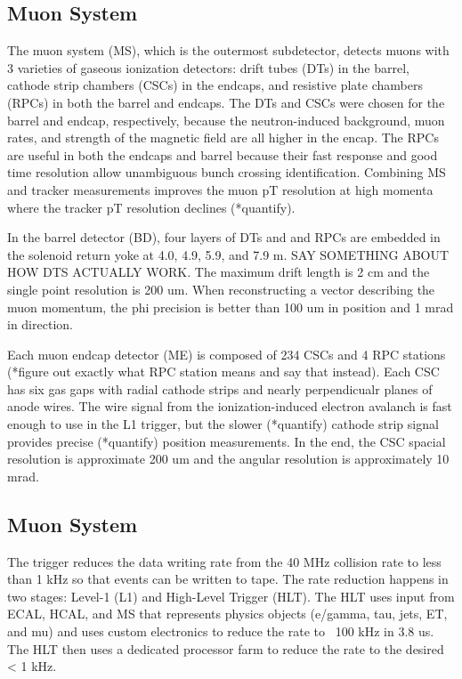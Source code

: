 \documentclass[12pt]{article}
\begin{document}
\subsection{Muon System}
        The muon system (MS), which is the outermost subdetector, detects muons with 3 varieties of gaseous ionization detectors: drift tubes (DTs) in the barrel, cathode strip chambers (CSCs) in the endcaps, and resistive plate chambers (RPCs) in both the barrel and endcaps. The DTs and CSCs were chosen for the barrel and endcap, respectively, because the neutron-induced background, muon rates, and strength of the magnetic field are all higher in the encap. The RPCs are useful in both the endcaps and barrel because their fast response and good time resolution allow unambiguous bunch crossing identification. Combining MS and tracker measurements improves the muon pT resolution at high momenta where the tracker pT resolution declines (*quantify).

        In the barrel detector (BD), four layers of DTs and and RPCs are embedded in the solenoid return yoke at 4.0, 4.9, 5.9, and 7.9 m. SAY SOMETHING ABOUT HOW DTS ACTUALLY WORK. The maximum drift length is 2 cm and the single point resolution is 200 um. When reconstructing a vector describing the muon momentum, the phi precision is better than 100 um in position and 1 mrad in direction. 

        Each muon endcap detector (ME) is composed of 234 CSCs and 4 RPC stations (*figure out exactly what RPC station means and say that instead). Each CSC has six gas gaps with radial cathode strips and nearly perpendicualr planes of anode wires. The wire signal from the ionization-induced electron avalanch is fast enough to use in the L1 trigger, but the slower (*quantify) cathode strip signal provides precise (*quantify) position measurements. In the end, the CSC spacial resolution is approximate 200 um and the angular resolution is approximately 10 mrad.

\subsection{Muon System}
        The trigger reduces the data writing rate from the 40 MHz collision rate to less than 1 kHz so that events can be written to tape. The rate reduction happens in two stages: Level-1 (L1) and High-Level Trigger (HLT). The HLT uses input from ECAL, HCAL, and MS that represents physics objects (e/gamma, tau, jets, ET, and mu) and uses custom electronics to reduce the rate to ~100 kHz in 3.8 us. The HLT then uses a dedicated processor farm to reduce the rate to the desired < 1 kHz.
\end{document}
